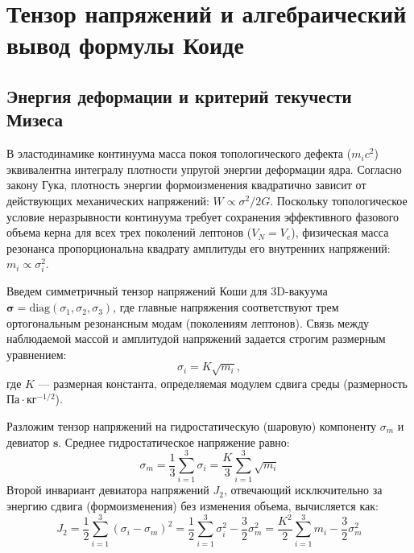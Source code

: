\documentclass[12pt,a4paper]{article}
\begin{document}
	\section{Тензор напряжений и алгебраический вывод формулы Коиде}
	
	\subsection{Энергия деформации и критерий текучести Мизеса}
	В эластодинамике континуума масса покоя топологического дефекта ($m_i c^2$) эквивалентна интегралу плотности упругой энергии деформации ядра. Согласно закону Гука, плотность энергии формоизменения квадратично зависит от действующих механических напряжений: $W \propto \sigma^2 / 2G$.
	Поскольку топологическое условие неразрывности континуума требует сохранения эффективного фазового объема керна для всех трех поколений лептонов ($V_N = V_e$), физическая масса резонанса пропорциональна квадрату амплитуды его внутренних напряжений: $m_i \propto \sigma_i^2$.
	
	Введем симметричный тензор напряжений Коши для 3D-вакуума $\boldsymbol{\sigma} = \text{diag}(\sigma_1, \sigma_2, \sigma_3)$, где главные напряжения соответствуют трем ортогональным резонансным модам (поколениям лептонов). Связь между наблюдаемой массой и амплитудой напряжений задается строгим размерным уравнением:
	\begin{equation}
		\sigma_i = K \sqrt{m_i},
	\end{equation}
	где $K$ — размерная константа, определяемая модулем сдвига среды (размерность $\text{Па}\cdot\text{кг}^{-1/2}$).
	
	Разложим тензор напряжений на гидростатическую (шаровую) компоненту $\sigma_m$ и девиатор $\mathbf{s}$. Среднее гидростатическое напряжение равно:
	\begin{equation}
		\sigma_m = \frac{1}{3}\sum_{i=1}^3 \sigma_i = \frac{K}{3} \sum_{i=1}^3 \sqrt{m_i}
	\end{equation}
	Второй инвариант девиатора напряжений $J_2$, отвечающий исключительно за энергию сдвига (формоизменения) без изменения объема, вычисляется как:
	\begin{equation}
		J_2 = \frac{1}{2} \sum_{i=1}^3 (\sigma_i - \sigma_m)^2 = \frac{1}{2} \sum_{i=1}^3 \sigma_i^2 - \frac{3}{2} \sigma_m^2 = \frac{K^2}{2} \sum_{i=1}^3 m_i - \frac{3}{2} \sigma_m^2
	\end{equation}
	
\end{document}
